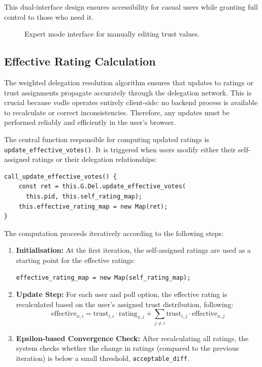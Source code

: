 This dual-interface design ensures accessibility for casual users while granting full control to those who need it.

\begin{figure}[h]
    \centering
    \caption{Expert mode interface for manually editing trust values.}
    \label{fig:expert-mode}
\end{figure}

\subsection{Effective Rating Calculation}

The weighted delegation resolution algorithm ensures that updates to ratings or trust assignments propagate accurately through the delegation network. This is crucial because vodle operates entirely client-side: no backend process is available to recalculate or correct inconsistencies. Therefore, any updates must be performed reliably and efficiently in the user's browser.

The central function responsible for computing updated ratings is \texttt{update\_effective\_votes()}. It is triggered when users modify either their self-assigned ratings or their delegation relationships:

\begin{verbatim}
call_update_effective_votes() {
    const ret = this.G.Del.update_effective_votes(
      this.pid, this.self_rating_map);
    this.effective_rating_map = new Map(ret);
}
\end{verbatim}

The computation proceeds iteratively according to the following steps:

\begin{enumerate}
    \item \textbf{Initialisation:} At the first iteration, the self-assigned ratings are used as a starting point for the effective ratings:
    \begin{verbatim}
effective_rating_map = new Map(self_rating_map);
    \end{verbatim}
    \item \textbf{Update Step:} For each user and poll option, the effective rating is recalculated based on the user's assigned trust distribution, following:
    \begin{equation}
      \text{effective}_{x, i} = \text{trust}_{i,i} \cdot \text{rating}_{x,i} + \sum_{j \neq i} \text{trust}_{i,j} \cdot \text{effective}_{x,j}
      \label{eq:effective_rating}
    \end{equation}      
    \item \textbf{Epsilon-based Convergence Check:} After recalculating all ratings, the system checks whether the change in ratings (compared to the previous iteration) is below a small threshold, \texttt{acceptable\_diff}.
\end{enumerate}

